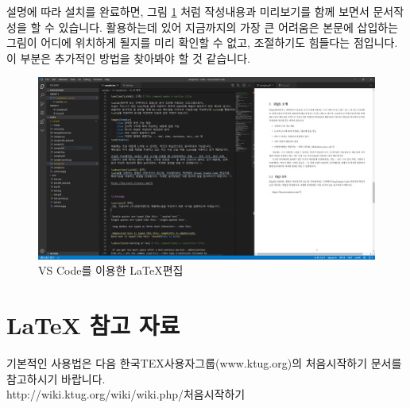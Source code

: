 설명에 따라 설치를 완료하면, 그림 \ref{fig:vscode} 처럼 작성내용과 미리보기를 함께 보면서 문서작성을 할 수 있습니다.
 활용하는데 있어 지금까지의 가장 큰 어려움은 본문에 삽입하는 그림이 어디에 위치하게 될지를 미리 확인할 수 없고,
조절하기도 힘들다는 점입니다.
이 부분은 추가적인 방법을 찾아봐야 할 것 같습니다.

\begin{figure}[t!]
    \centering
    \includegraphics[scale=0.3]{images/chapter1/vscode.png}
    \caption{VS Code를 이용한 \LaTeX 편집}
    \label{fig:vscode}
\end{figure}

\section{\LaTeX{} 참고 자료}
 기본적인 사용법은 다음 한국TEX사용자그룹(www.ktug.org)의 처음시작하기 문서를 참고하시기 바랍니다. \\

http://wiki.ktug.org/wiki/wiki.php/처음시작하기 \\
\clearpage

